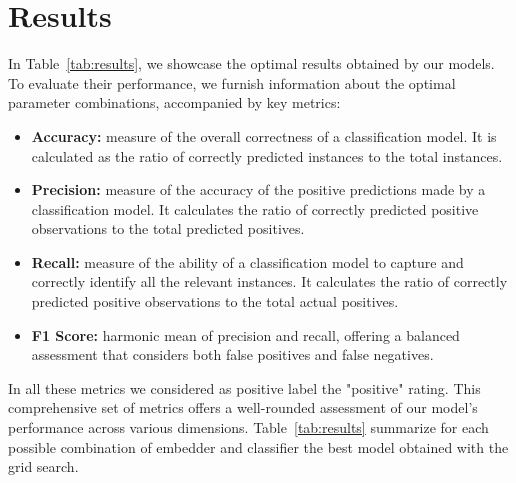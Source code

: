 \section{Results}


In Table~\ref{tab:results}, we showcase the optimal results obtained by our models. To evaluate their performance, we furnish information about the optimal parameter combinations, accompanied by key metrics:

\begin{itemize}
    \item \textbf{Accuracy:} measure of the overall correctness of a classification model. It is calculated as the ratio of correctly predicted instances to the total instances.
    
    \item \textbf{Precision:} measure of the accuracy of the positive predictions made by a classification model. It calculates the ratio of correctly predicted positive observations to the total predicted positives.
    
    \item \textbf{Recall:} measure of the ability of a classification model to capture and correctly identify all the relevant instances. It calculates the ratio of correctly predicted positive observations to the total actual positives.
    
    \item \textbf{F1 Score:} harmonic mean of precision and recall, offering a balanced assessment that considers both false positives and false negatives.
    
\end{itemize}

In all these metrics we considered as positive label the "positive" rating. This comprehensive set of metrics offers a well-rounded assessment of our model's performance across various dimensions. Table~\ref{tab:results} summarize for each possible combination of embedder and classifier the best model obtained with the grid search.



